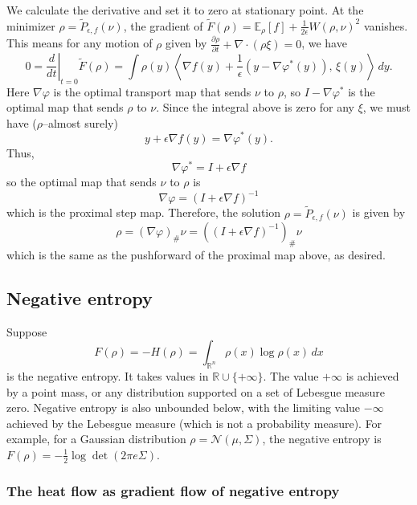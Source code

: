\documentclass[final,12pt]{colt2018}
\newcommand{\R}{\mathbb{R}}
\newcommand{\E}{\mathbb{E}}
\newcommand{\N}{\mathcal{N}}
\renewcommand{\part}[2]{\frac{\partial #1}{\partial #2}}
\begin{document}
We calculate the derivative and set it to zero at stationary point. 
At the minimizer $\rho = \widetilde P_{\epsilon,f}(\nu)$, the gradient of $\widetilde F(\rho) = \E_\rho[f] + \frac{1}{2\epsilon} W(\rho,\nu)^2$ vanishes.
This means for any motion of $\rho$ given by $\part{\rho}{t} + \nabla \cdot (\rho \xi) = 0$, we have
$$0 = \left.\frac{d}{dt} \right|_{t=0} \widetilde F(\rho) = \int \rho(y) \left\langle \nabla f(y) + \frac{1}{\epsilon}(y-\nabla \varphi^\ast(y)), \, \xi(y) \right \rangle \, dy.$$
Here $\nabla \varphi$ is the optimal transport map that sends $\nu$ to $\rho$, so $I - \nabla \varphi^\ast$ is the optimal map that sends $\rho$ to $\nu$.
Since the integral above is zero for any $\xi$, we must have ($\rho$--almost surely)
$$y + \epsilon \nabla f(y) = \nabla \varphi^\ast(y).$$
Thus, 
$$\nabla \varphi^\ast = I + \epsilon \nabla f$$
so the optimal map that sends $\nu$ to $\rho$ is
$$\nabla \varphi = (I + \epsilon \nabla f)^{-1}$$
which is the proximal step map.
Therefore, the solution $\rho = \widetilde P_{\epsilon,f}(\nu)$ is given by
$$\rho = (\nabla \varphi)_\# \nu = ((I+\epsilon \nabla f)^{-1})_\# \nu$$
which is the same as the pushforward of the proximal map above, as desired.


\subsection{Negative entropy}
\label{App:Ent}

Suppose
$$F(\rho) = -H(\rho) = \int_{\R^n} \rho(x) \log \rho(x) \, dx$$
is the negative entropy.
It takes values in $\R \cup \{+\infty\}$.
The value $+\infty$ is achieved by a point mass, or any distribution supported on a set of Lebesgue measure zero.
Negative entropy is also unbounded below, with the limiting value $-\infty$ achieved by the Lebesgue measure (which is not a probability measure).
For example, for a Gaussian distribution $\rho = \N(\mu,\Sigma)$, the negative entropy is $F(\rho) = -\frac{1}{2} \log \det(2 \pi e \Sigma)$.


\subsubsection{The heat flow as gradient flow of negative entropy}
\label{Sec:Heat}
\end{document}

